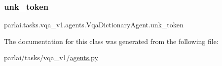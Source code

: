 \subsubsection{\texorpdfstring{unk\+\_\+token}{unk\_token}}
{\footnotesize\ttfamily parlai.\+tasks.\+vqa\+\_\+v1.\+agents.\+Vqa\+Dictionary\+Agent.\+unk\+\_\+token}



The documentation for this class was generated from the following file\+:\begin{DoxyCompactItemize}
\item 
parlai/tasks/vqa\+\_\+v1/\hyperlink{parlai_2tasks_2vqa__v1_2agents_8py}{agents.\+py}\end{DoxyCompactItemize}
